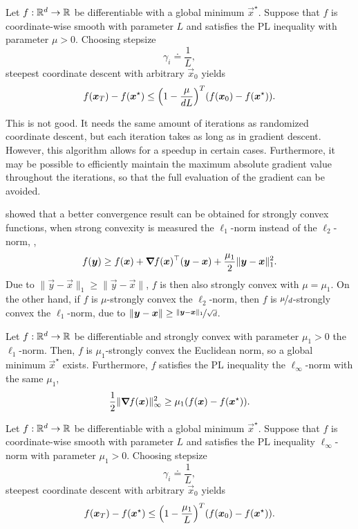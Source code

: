 \begin{corollary}
    Let $f: \R^d \to \R$ be differentiable with a global minimum $\vec{x}^\star$. Suppose that $f$ is coordinate-wise smooth with parameter $L$ and satisfies the PL inequality with parameter $\mu > 0$. Choosing stepsize \[
        \gamma_i \doteq \frac{1}{L},
    \]
    steepest coordinate descent with arbitrary $\vec{x}_0$ yields \[
        f(\vec{x}_T) - f(\vec{x}^\star) \leq \lft( 1 - \frac{\mu}{dL} \rgt)^T (f(\vec{x}_0) - f(\vec{x}^\star)).
    \]
\end{corollary}

This is not good. It needs the same amount of iterations as randomized coordinate descent, but each
iteration takes as long as in gradient descent. However, this algorithm allows for a
speedup in certain cases. Furthermore, it may be possible to efficiently maintain the maximum
absolute gradient value throughout the iterations, so that the full evaluation of the gradient can
be avoided.

\cite{nutini2015coordinate} showed that a better convergence result can be obtained for strongly
convex functions, when strong convexity is measured \wrt the $\ell_1$-norm instead of the
$\ell_2$-norm, \ie, \[
    f(\vec{y}) \geq f(\vec{x}) + \transpose{\grad{f(\vec{x})}{}} (\vec{y}-\vec{x}) + \frac{\mu_1}{2} \|\vec{y} - \vec{x}\|_1^2.
\]
Due to $\| \vec{y} - \vec{x} \|_1 \geq \| \vec{y} - \vec{x} \|$, $f$ is then also strongly convex
with $\mu = \mu_1$. On the other hand, if $f$ is $\mu$-strongly convex \wrt the $\ell_2$-norm, then
$f$ is $\nicefrac{\mu}{d}$-strongly convex \wrt the $\ell_1$-norm, due to $\|\vec{y}-\vec{x}\| \geq
    \nicefrac{\|\vec{y}-\vec{x}\|_1}{\sqrt{d}}$.

\begin{lemma}
    Let $f: \R^d \to \R$ be differentiable and strongly convex with parameter $\mu_1 > 0$ \wrt the
    $\ell_1$-norm. Then, $f$ is $\mu_1$-strongly convex \wrt the Euclidean norm, so a global minimum
    $\vec{x}^\star$ exists. Furthermore, $f$ satisfies the PL inequality \wrt the $\ell_{\infty}$-norm with the same $\mu_1$, \[
        \frac{1}{2} \| \grad{f(\vec{x})}{} \|_{\infty}^2 \geq \mu_1 (f(\vec{x}) - f(\vec{x}^\star)).
    \]
\end{lemma}

\begin{theorem}
    Let $f: \R^d \to \R$ be differentiable with a global minimum $\vec{x}^\star$. Suppose that $f$ is
    coordinate-wise smooth with parameter $L$ and satisfies the PL inequality \wrt $\ell_{\infty}$-norm
    with parameter $\mu_1 > 0$. Choosing stepsize \[
        \gamma_i \doteq \frac{1}{L},
    \]
    steepest coordinate descent with arbitrary $\vec{x}_0$ yields \[
        f(\vec{x}_T) - f(\vec{x}^\star) \leq \lft( 1 - \frac{\mu_1}{L} \rgt)^T (f(\vec{x}_0) - f(\vec{x}^\star)).
    \]
\end{theorem}


